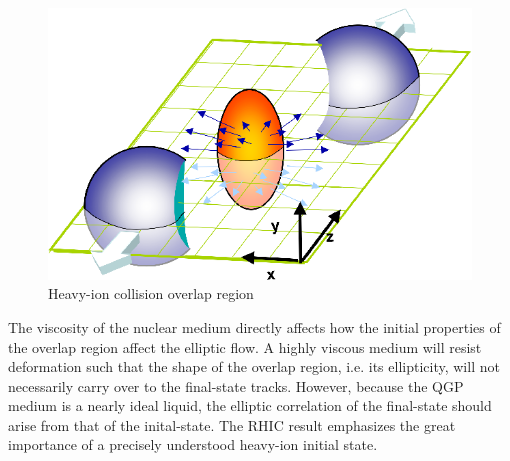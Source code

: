 \begin{figure}[h!]
\begin{centering}
\includegraphics[width=5in]{Chapter1/importfigs/elliptic_flow_3D_medium.png}
\par\end{centering}
\caption{Heavy-ion collision overlap region \label{fig:overlap}}
\end{figure}

The viscosity of the nuclear medium directly affects how the initial properties of the overlap region affect the elliptic flow. A highly viscous medium will resist deformation such that the shape of the overlap region, i.e. its ellipticity, will not necessarily carry over to the final-state tracks. However, because the QGP medium is a nearly ideal liquid, the elliptic correlation of the final-state should arise from that of the inital-state. The RHIC result emphasizes the great importance of a precisely understood heavy-ion initial state.

